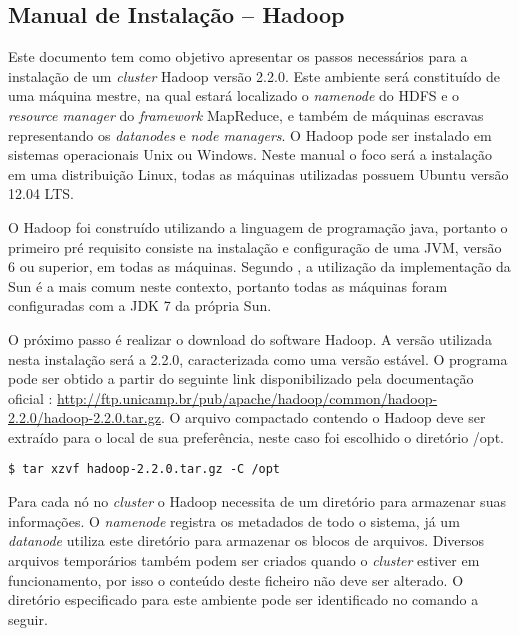 \begin{apendicesenv}

\chapter{Manual de Instalação – Hadoop}
\label{apd-hadoop}

Este documento tem como objetivo apresentar os passos necessários para a instalação de um \textit{cluster} Hadoop versão 2.2.0. Este ambiente será constituído de uma máquina mestre, na qual estará localizado o \textit{namenode} do HDFS e o \textit{resource manager} do \textit{framework} MapReduce, e também de máquinas escravas representando os \textit{datanodes} e \textit{node managers}. O Hadoop pode ser instalado em sistemas operacionais Unix ou Windows. Neste manual o foco será a instalação em uma distribuição Linux, todas as máquinas utilizadas possuem Ubuntu versão 12.04 LTS.

O Hadoop foi construído utilizando a linguagem de programação java, portanto o primeiro pré requisito consiste na instalação e configuração de uma JVM, versão 6 ou superior, em todas as máquinas. Segundo , a utilização da implementação da Sun é a mais comum neste contexto, portanto todas as máquinas foram configuradas com a JDK 7 da própria Sun.

O próximo passo é realizar o download do software Hadoop. A versão utilizada nesta instalação será a 2.2.0, caracterizada como uma versão estável. O programa pode ser obtido a partir do seguinte link disponibilizado pela documentação oficial \cite{hadoopSite}: \url{http://ftp.unicamp.br/pub/apache/hadoop/common/hadoop-2.2.0/hadoop-2.2.0.tar.gz}. O arquivo compactado contendo o Hadoop deve ser extraído para o local de sua preferência, neste caso foi escolhido o diretório /opt.

\begin{lstlisting}[style=abnt,frame=single]
$ tar xzvf hadoop-2.2.0.tar.gz -C /opt
\end{lstlisting}

Para cada nó no \textit{cluster} o Hadoop necessita de um diretório para armazenar suas informações. O \textit{namenode} registra os metadados de todo o sistema, já um \textit{datanode} utiliza este diretório para armazenar os blocos de arquivos. Diversos arquivos temporários também podem ser criados quando o \textit{cluster} estiver em funcionamento, por isso o conteúdo deste ficheiro não deve ser alterado. O diretório especificado para este ambiente pode ser identificado no comando a seguir.


\end{apendicesenv}

